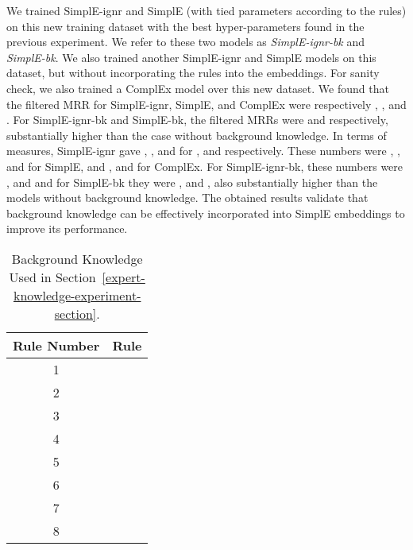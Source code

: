 \documentclass{article}
\begin{document}
We trained SimplE-ignr and SimplE (with tied parameters according to the rules) on this new training dataset with the best hyper-parameters found in the previous experiment. We refer to these two models as \emph{SimplE-ignr-bk} and \emph{SimplE-bk}. We also trained another SimplE-ignr and SimplE models on this dataset, but without incorporating the rules into the embeddings. For sanity check, we also trained a ComplEx model over this new dataset. 
We found that the filtered MRR for SimplE-ignr, SimplE, and ComplEx were respectively , , and . For SimplE-ignr-bk and SimplE-bk, the filtered MRRs were  and  respectively, substantially higher than the case without background knowledge. In terms of  measures, SimplE-ignr gave , , and  for ,  and  respectively. These numbers were , , and  for SimplE, and ,  and  for ComplEx. For SimplE-ignr-bk, these numbers were ,  and  and for SimplE-bk they were ,  and , also substantially higher than the models without background knowledge. The obtained results validate that background knowledge can be effectively incorporated into SimplE embeddings to improve its performance. 

\begin{table}[t]
\scriptsize
\caption{Background Knowledge Used in Section~\ref{expert-knowledge-experiment-section}.}
\label{rules-table}
\begin{center}
\begin{tabular}{c|c}
Rule Number & Rule \\ \hline
1 &  \\
2 &  \\
3 &  \\
4 &  \\
5 &  \\
6 &  \\
7 &  \\
8 & 
\end{tabular}
\end{center}
\end{table}
\end{document}
